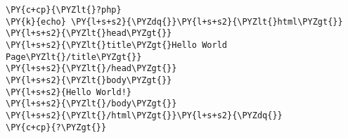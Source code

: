 \begin{Verbatim}[commandchars=\\\{\}]
\PY{c+cp}{\PYZlt{}?php}
\PY{k}{echo} \PY{l+s+s2}{\PYZdq{}}\PY{l+s+s2}{\PYZlt{}html\PYZgt{}}
\PY{l+s+s2}{\PYZlt{}head\PYZgt{}}
\PY{l+s+s2}{\PYZlt{}title\PYZgt{}Hello World Page\PYZlt{}/title\PYZgt{}}
\PY{l+s+s2}{\PYZlt{}/head\PYZgt{}}
\PY{l+s+s2}{\PYZlt{}body\PYZgt{}}
\PY{l+s+s2}{Hello World!}
\PY{l+s+s2}{\PYZlt{}/body\PYZgt{}}
\PY{l+s+s2}{\PYZlt{}/html\PYZgt{}}\PY{l+s+s2}{\PYZdq{}}
\PY{c+cp}{?\PYZgt{}}
\end{Verbatim}
